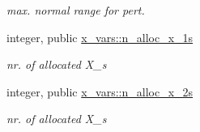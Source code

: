 \begin{DoxyCompactItemize}
\begin{DoxyCompactList}\small\item\em max. normal range for pert. \end{DoxyCompactList}\item 
integer, public \hyperlink{namespacex__vars_af565ad5c65071b130e69d528aa6faf1d}{x\+\_\+vars\+::n\+\_\+alloc\+\_\+x\+\_\+1s}
\begin{DoxyCompactList}\small\item\em nr. of allocated {\ttfamily X\+\_}\textquotesingle{}s \end{DoxyCompactList}\item 
integer, public \hyperlink{namespacex__vars_add0d925899063fbe0c4ff05d21f35a23}{x\+\_\+vars\+::n\+\_\+alloc\+\_\+x\+\_\+2s}
\begin{DoxyCompactList}\small\item\em nr. of allocated {\ttfamily X\+\_}\textquotesingle{}s \end{DoxyCompactList}\end{DoxyCompactItemize}
